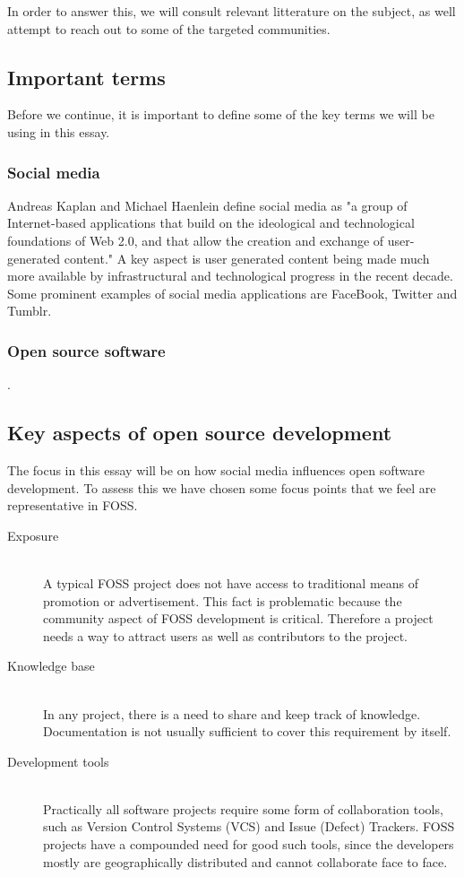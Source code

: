 \documentclass[a4paper,11pt]{article} %
\begin{document}
In order to answer this, we will consult relevant litterature on the subject, as well attempt to reach out
to some of the targeted communities. 

\subsection{Important terms}
Before we continue, it is important to define some of the key terms we will be using
in this essay. 
\subsubsection*{Social media}
Andreas Kaplan and Michael Haenlein define social media as "a group of Internet-based applications that build on the ideological and technological foundations of Web 2.0, and that allow the creation and exchange of user-generated content."\cite{Kaplan201059} A key aspect is user generated content being made much more available by infrastructural and technological progress in the recent decade. Some prominent examples of social media applications are FaceBook, Twitter and Tumblr.
\subsubsection*{Open source software}
\cite{leister2014opensource}.

\subsection{Key aspects of open source development}

The focus in this essay will be on how social media influences open software development. To assess
this we have chosen some focus points that we feel are representative in FOSS. 

\begin{description}
  \item[Exposure] \hfill \\
  A typical FOSS project does not have access to traditional means of
  promotion or advertisement. This fact is problematic because the community
  aspect of FOSS development is critical. Therefore a project needs a way to
  attract users as well as contributors to the project.
  \item[Knowledge base] \hfill \\ In any project, there is a need to
	share and keep track of knowledge. Documentation is not usually
	sufficient to cover this requirement by itself.
	\item[Development tools] \hfill \\
	Practically all software projects
	require some form of collaboration tools, such as Version Control
	Systems (VCS) and Issue (Defect) Trackers. FOSS projects have a
	compounded need for good such tools, since the developers mostly
	are geographically distributed and cannot collaborate face to
	face. 

\end{description}
\end{document}
